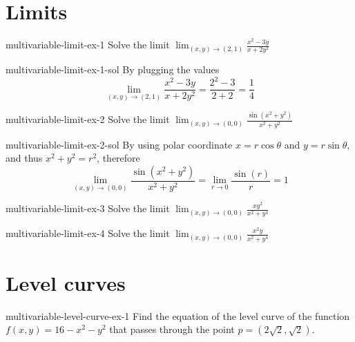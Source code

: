 \documentclass[preview]{standalone}
\begin{document}
\genpage

\section{Limits}

\begin{snippetexercise}{multivariable-limit-ex-1}{}
Solve the limit \(\lim _{(x, y) \rightarrow(2,1)} \frac{x^2-3 y}{x+2 y^2}\)
\end{snippetexercise}

\begin{snippetsolution}{multivariable-limit-ex-1-sol}{}
By plugging the values \[
    \lim _{(x, y) \rightarrow(2,1)} \frac{x^2-3 y}{x+2 y^2}
    = \frac{2^2-3}{2+2} = \frac{1}{4}
\]
\end{snippetsolution}

\begin{snippetexercise}{multivariable-limit-ex-2}{}
Solve the limit \(\lim _{(x, y) \rightarrow(0,0)} \frac{\sin \left(x^2+y^2\right)}{x^2+y^2}\)
\end{snippetexercise}

\begin{snippetsolution}{multivariable-limit-ex-2-sol}{}
By using polar coordinate \(x=r\cos\theta\) and \(y=r\sin\theta\),
and thus \(x^2+y^2=r^2\), therefore
\[
    \lim_{(x, y) \rightarrow(0,0)} \frac{\sin \left(x^2+y^2\right)}{x^2+y^2}
    = \lim_{r \rightarrow 0} \frac{\sin \left(r\right)}{r}=1
\]
\end{snippetsolution}

\begin{snippetexercise}{multivariable-limit-ex-3}{}
Solve the limit \(\lim _{(x, y) \rightarrow(0,0)} \frac{x y^2}{x^2+y^4}\)
\end{snippetexercise}

\begin{snippetexercise}{multivariable-limit-ex-4}{}
Solve the limit \(\lim _{(x, y) \rightarrow(0,0)} \frac{x^2 y}{x^2+y^4}\)
\end{snippetexercise}

\section{Level curves}

\begin{snippetexercise}{multivariable-level-curve-ex-1}{}
    Find the equation of the level curve of the function \(f(x,y) = 16-x^2-y^2\)
    that passes through the point \(p=(2\sqrt{2}, \sqrt{2})\).
\end{snippetexercise}
\end{document}
